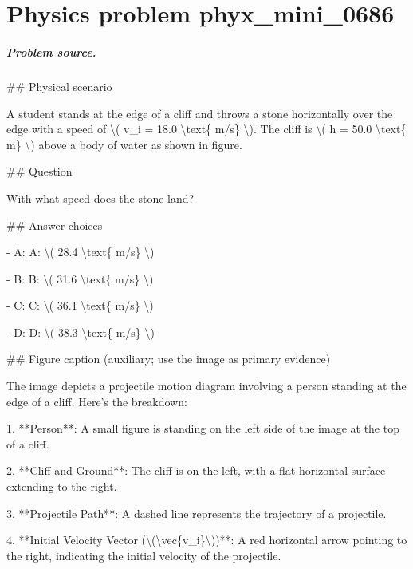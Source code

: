 
\chapter{Physics problem phyx\_mini\_0686}
\label{ch:PhyXMiniProblems_problem_phyx_mini_0686}

\paragraph{Problem source.}
\#\# Physical scenario

A student stands at the edge of a cliff and throws a stone horizontally over the edge with a speed of \textbackslash{}( v\_i = 18.0 \textbackslash{}text\{ m/s\} \textbackslash{}). The cliff is \textbackslash{}( h = 50.0 \textbackslash{}text\{ m\} \textbackslash{}) above a body of water as shown in figure.

\#\# Question

With what speed does the stone land?

\#\# Answer choices

- A: A: \textbackslash{}( 28.4 \textbackslash{}text\{ m/s\} \textbackslash{})

- B: B: \textbackslash{}( 31.6 \textbackslash{}text\{ m/s\} \textbackslash{})

- C: C: \textbackslash{}( 36.1 \textbackslash{}text\{ m/s\} \textbackslash{})

- D: D: \textbackslash{}( 38.3 \textbackslash{}text\{ m/s\} \textbackslash{})

\#\# Figure caption (auxiliary; use the image as primary evidence)

The image depicts a projectile motion diagram involving a person standing at the edge of a cliff. Here's the breakdown:

1. **Person**: A small figure is standing on the left side of the image at the top of a cliff.

2. **Cliff and Ground**: The cliff is on the left, with a flat horizontal surface extending to the right. 

3. **Projectile Path**: A dashed line represents the trajectory of a projectile.

4. **Initial Velocity Vector (\textbackslash{}(\textbackslash{}vec\{v\_i\}\textbackslash{}))**: A red horizontal arrow pointing to the right, indicating the initial velocity of the projectile.

